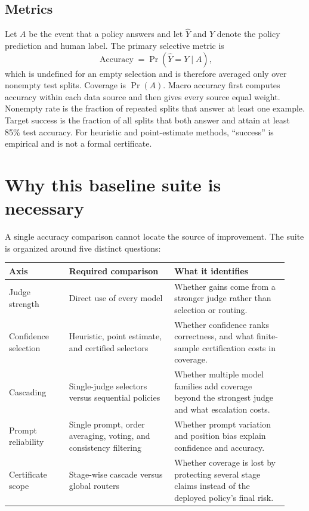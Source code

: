 \documentclass[10pt]{article}
\newcommand{\target}{85\%}
\begin{document}
\subsection{Metrics}

Let $A$ be the event that a policy answers and let $\widehat{Y}$ and $Y$ denote the
policy prediction and human label. The primary selective metric is
\[
  \operatorname{Accuracy}=\Pr(\widehat{Y}=Y\mid A),
\]
which is undefined for an empty selection and is therefore averaged only over nonempty
test splits. Coverage is $\Pr(A)$. Macro accuracy first computes accuracy within each
data source and then gives every source equal weight. Nonempty rate is the fraction of
repeated splits that answer at least one example. Target success is the fraction of all
splits that both answer and attain at least \target{} test accuracy. For heuristic and
point-estimate methods, ``success'' is empirical and is not a formal certificate.

\section{Why this baseline suite is necessary}

A single accuracy comparison cannot locate the source of improvement. The suite is
organized around five distinct questions:

\begin{longtable}{@{}p{0.20\linewidth}p{0.35\linewidth}p{0.38\linewidth}@{}}
\toprule
\textbf{Axis} & \textbf{Required comparison} & \textbf{What it identifies} \\
\midrule
\endhead
Judge strength & Direct use of every model & Whether gains come from a stronger judge rather than selection or routing. \\
Confidence selection & Heuristic, point estimate, and certified selectors & Whether confidence ranks correctness, and what finite-sample certification costs in coverage. \\
Cascading & Single-judge selectors versus sequential policies & Whether multiple model families add coverage beyond the strongest judge and what escalation costs. \\
Prompt reliability & Single prompt, order averaging, voting, and consistency filtering & Whether prompt variation and position bias explain confidence and accuracy. \\
Certificate scope & Stage-wise cascade versus global routers & Whether coverage is lost by protecting several stage claims instead of the deployed policy's final risk. \\
\bottomrule
\end{longtable}
\end{document}
